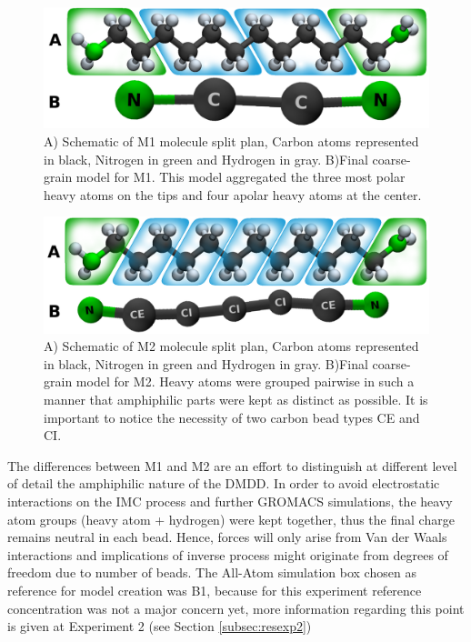 \documentclass[10pt,a4paper,twoside]{article}
\begin{document}
 \begin{figure}[ht]
 \centering
	\includegraphics[width=0.9 \textwidth]{./images/M1ab}
	\caption{A) Schematic of M1 molecule split plan, Carbon atoms represented in black, Nitrogen in green and Hydrogen in gray. B)Final coarse-grain model for M1. This model aggregated the three most polar heavy atoms on the tips and four apolar heavy atoms at the center.}
	\label{Fig:mol1}
\end{figure}
 \begin{figure}[ht]
 \centering
	\includegraphics[width=0.9 \textwidth]{./images/M2ab}
	\caption{A) Schematic of M2 molecule split plan, Carbon atoms represented in black, Nitrogen in green and Hydrogen in gray. B)Final coarse-grain model for M2. Heavy atoms were grouped pairwise in such a manner that amphiphilic parts were kept as distinct as possible. It is important to notice the necessity of two carbon bead types CE and CI.}
		\label{Fig:mol2}
\end{figure}
 
 The differences between M1 and M2 are an effort to distinguish at different level of detail the amphiphilic nature of the DMDD. In order to avoid electrostatic interactions on the IMC process and further GROMACS simulations, the heavy atom groups (heavy atom + hydrogen) were kept together, thus the final charge remains neutral in each bead. Hence, forces will only arise from Van der Waals interactions and implications of inverse process might originate from  degrees of freedom due to number of beads. The All-Atom simulation box chosen as reference for model creation was B1, because for this experiment reference concentration was not a major concern yet, more information regarding this point is given at Experiment 2 (see Section \ref{subsec:resexp2})
   
\end{document}

